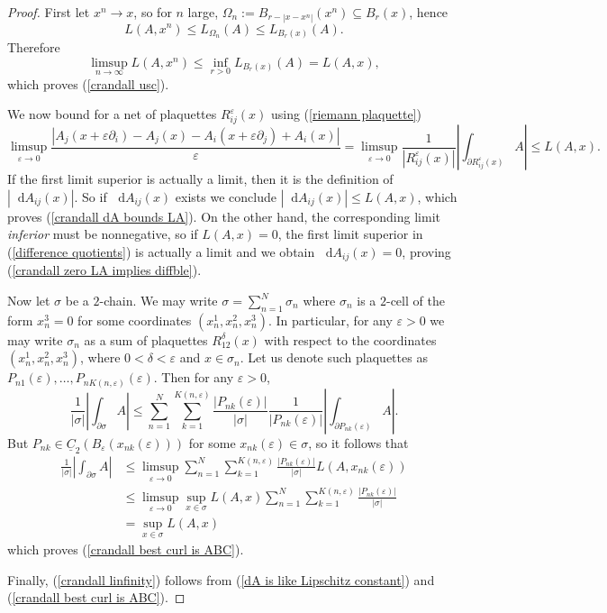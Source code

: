 \documentclass[reqno,11pt]{amsart}
\newcommand*\dif{\mathop{}\!\mathrm{d}}
\newcommand{\Chain}{\underline C}
\theoremstyle{definition}
\numberwithin{equation}{section}
\begin{document}
\begin{proof}
First let $x^n \to x$, so for $n$ large, $\Omega_n := B_{r - |x - x^n|}(x^n) \subseteq B_r(x)$, hence
$$L(A, x^n) \leq L_{\Omega_n}(A) \leq L_{B_r(x)}(A).$$
Therefore 
$$\limsup_{n \to \infty} L(A, x^n) \leq \inf_{r > 0} L_{B_r(x)}(A) = L(A, x),$$
which proves (\ref{crandall usc}).
	
We now bound for a net of plaquettes $R_{ij}^\varepsilon(x)$ using (\ref{riemann plaquette})
\begin{equation}\label{difference quotients}
	\limsup_{\varepsilon \to 0} \frac{|A_j(x + \varepsilon \partial_i) - A_j(x) - A_i(x + \varepsilon \partial_j) + A_i(x)|}{\varepsilon}
= \limsup_{\varepsilon \to 0} \frac{1}{|R_{ij}^\varepsilon(x)|} \left|\int_{\partial R_{ij}^\varepsilon(x)} A\right| \leq L(A, x).
\end{equation}
If the first limit superior is actually a limit, then it is the definition of $|\dif A_{ij}(x)|$.
So if $\dif A_{ij}(x)$ exists we conclude $|\dif A_{ij}(x)| \leq L(A, x)$, which proves (\ref{crandall dA bounds LA}).
On the other hand, the corresponding limit \emph{inferior} must be nonnegative, so if $L(A, x) = 0$, the first limit superior in (\ref{difference quotients}) is actually a limit and we obtain $\dif A_{ij}(x) = 0$, proving (\ref{crandall zero LA implies diffble}).

Now let $\sigma$ be a $2$-chain.
We may write $\sigma = \sum_{n=1}^N \sigma_n$ where $\sigma_n$ is a $2$-cell of the form $x^3_n = 0$ for some coordinates $(x^1_n, x^2_n, x^3_n)$.
In particular, for any $\varepsilon > 0$ we may write $\sigma_n$ as a sum of plaquettes $R_{12}^\delta(x)$ with respect to the coordinates $(x^1_n, x^2_n, x^3_n)$, where $0 < \delta < \varepsilon$ and $x \in \sigma_n$.
Let us denote such plaquettes as $P_{n1}(\varepsilon), \dots, P_{nK(n, \varepsilon)}(\varepsilon)$. Then for any $\varepsilon > 0$, 
$$\frac{1}{|\sigma|} \left|\int_{\partial \sigma} A\right| \leq \sum_{n=1}^N \sum_{k=1}^{K(n, \varepsilon)} \frac{|P_{nk}(\varepsilon)|}{|\sigma|} \frac{1}{|P_{nk}(\varepsilon)|} \left|\int_{\partial P_{nk}(\varepsilon)} A\right|.$$
But $P_{nk} \in \Chain_2(B_\varepsilon(x_{nk}(\varepsilon)))$ for some $x_{nk}(\varepsilon) \in \sigma$, so it follows that 
\begin{align*}
\frac{1}{|\sigma|} \left|\int_{\partial \sigma} A\right|
&\leq \limsup_{\varepsilon \to 0} \sum_{n=1}^N \sum_{k=1}^{K(n, \varepsilon)} \frac{|P_{nk}(\varepsilon)|}{|\sigma|} L(A, x_{nk}(\varepsilon)) \\
&\leq \limsup_{\varepsilon \to 0} \sup_{x \in \sigma} L(A, x)  \sum_{n=1}^N \sum_{k=1}^{K(n, \varepsilon)} \frac{|P_{nk}(\varepsilon)|}{|\sigma|} \\
&= \sup_{x \in \sigma} L(A, x)
\end{align*}
which proves (\ref{crandall best curl is ABC}).

Finally, (\ref{crandall linfinity}) follows from (\ref{dA is like Lipschitz constant}) and (\ref{crandall best curl is ABC}).
\end{proof}
\end{document}
